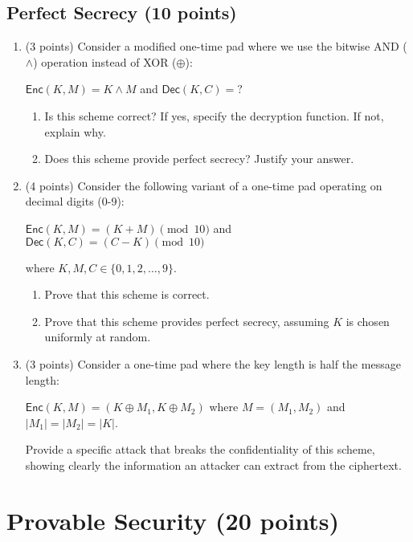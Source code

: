 \documentclass[10pt,a4paper,american]{exam}
\begin{document}
\subsection{Perfect Secrecy (10 points)}

\begin{enumerate}
	\item (3 points) Consider a modified one-time pad where we use the bitwise AND ($\land$) operation instead of XOR ($\oplus$):

	      $\textsf{Enc}(K, M) = K \land M$ and $\textsf{Dec}(K, C) = ?$

	      \begin{enumerate}
		      \item Is this scheme correct? If yes, specify the decryption function. If not, explain why.
		      \item Does this scheme provide perfect secrecy? Justify your answer.
	      \end{enumerate}

	\item (4 points) Consider the following variant of a one-time pad operating on decimal digits (0-9):

	      $\textsf{Enc}(K, M) = (K + M) \pmod{10}$ and $\textsf{Dec}(K, C) = (C - K) \pmod{10}$

	      where $K, M, C \in \{0, 1, 2, \ldots, 9\}$.

	      \begin{enumerate}
		      \item Prove that this scheme is correct.
		      \item Prove that this scheme provides perfect secrecy, assuming $K$ is chosen uniformly at random.
	      \end{enumerate}

	\item (3 points) Consider a one-time pad where the key length is half the message length:

	      $\textsf{Enc}(K, M) = (K \oplus M_1, K \oplus M_2)$ where $M = (M_1, M_2)$ and $|M_1| = |M_2| = |K|$.

	      Provide a specific attack that breaks the confidentiality of this scheme, showing clearly the information an attacker can extract from the ciphertext.
\end{enumerate}

\section{Provable Security (20 points)}
\end{document}
